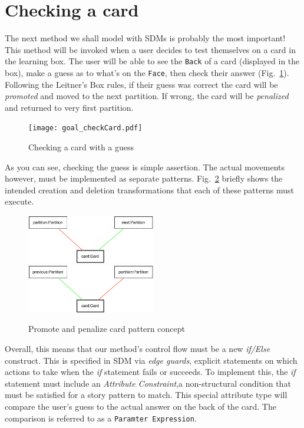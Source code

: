 \newpage
\section{Checking a card}
\genHeader
\hypertarget{sec:checkCard}{}

The next method we shall model with SDMs is probably the most important! This method will be invoked when a user decides to test themselves on a card in the
learning box. The user will be able to see the \texttt{Back} of a card (displayed in the box), make a guess as to what's on the \texttt{Face}, then check their
answer (Fig.~\ref{fig:goal_check}). Following the Leitner's Box rules, if their guess was correct the card will be \emph{promoted} and moved to the next
partition. If wrong, the card will be \emph{penalized} and returned to very first partition.

\begin{figure}[htbp]
 	\centering
   \texttt{[image: goal\_checkCard.pdf]}
 	\caption{Checking a card with a guess}
 	\label{fig:goal_check}
\end{figure}
\FloatBarrier

As you can see, checking the guess is simple assertion. The actual movements however, must be implemented as separate patterns. Fig.~\ref{fig:patterns_check}
briefly shows the intended creation and deletion transformations that each of these patterns must execute.

\begin{figure}[htbp]
 	\centering
   \includegraphics[width=0.5\textwidth]{checkCard_promote.pdf}
   \\ \vspace{1cm}
    \includegraphics[width=0.5\textwidth]{checkCard_penalize.pdf}
 	\caption{Promote and penalize card pattern concept}
 	\label{fig:patterns_check}
\end{figure}
\FloatBarrier

Overall, this means that our method's control flow must be a new \emph{if/Else} construct. This is specified in SDM via \emph{edge guards},
explicit statements on which actions to take when the \emph{if} statement fails or succeeds. To implement this, the \emph{if} statement must
include an \emph{Attribute Constraint},a non-structural condition that must be satisfied for a story pattern to match. This
special attribute type will compare the user's guess to the actual answer on the back of the card. The comparison is referred to as a \texttt{Paramter
Expression}.

